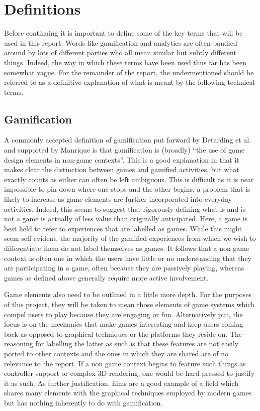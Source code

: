 \documentclass[12pt,a4paper,twoside]{report}
\begin{document}
\chapter{Definitions}
\label{sec:define}
Before continuing it is important to define some of the key terms that will be used in this report. Words like gamification and analytics are often bandied around by lots of different parties who all mean similar but subtly different things. Indeed, the way in which these terms have been used thus far has been somewhat vague. For the remainder of the report, the undermentioned should be referred to as a definitive explanation of what is meant by the following technical terms.

\section{Gamification}
A commonly accepted definition of gamification put forward by Detarding et al. \cite{deterding2011game} and supported by Manrique \cite{iversitymooc} is that gamification is (broadly) ``the use of game design elements in non-game contexts''. This is a good explanation in that it makes clear the distinction between games and gamified activities, but what exactly counts as either can often be left ambiguous. This is difficult as it is near impossible to pin down where one stops and the other begins, a problem that is likely to increase as game elements are further incorporated into everyday activities. Indeed, this seems to suggest that rigorously defining what is and is not a game is actually of less value than originally anticipated. Here, a game is best held to refer to experiences that are labelled as games. While this might seem self evident, the majority of the gamified experiences from which we wish to differentiate them do not label themselves as games. It follows that a non game context is often one in which the users have little or no understanding that they are participating in a game, often because they are passively playing, whereas games as defined above generally require more active involvement.

Game elements also need to be outlined in a little more depth. For the purposes of this project, they will be taken to mean those elements of game systems which compel users to play because they are engaging or fun. Alternatively put, the focus is on the mechanics that make games interesting and keep users coming back as opposed to graphical techniques or the platforms they reside on. The reasoning for labelling the latter as such is that these features are not easily ported to other contexts and the ones in which they are shared are of no relevance to the report. If a non game context begins to feature such things as controller support or complex 3D rendering, one would be hard pressed to justify it as such. As further justification, films are a good example of a field which shares many elements with the graphical techniques employed by modern games but has nothing inherently to do with gamification.
\end{document}

